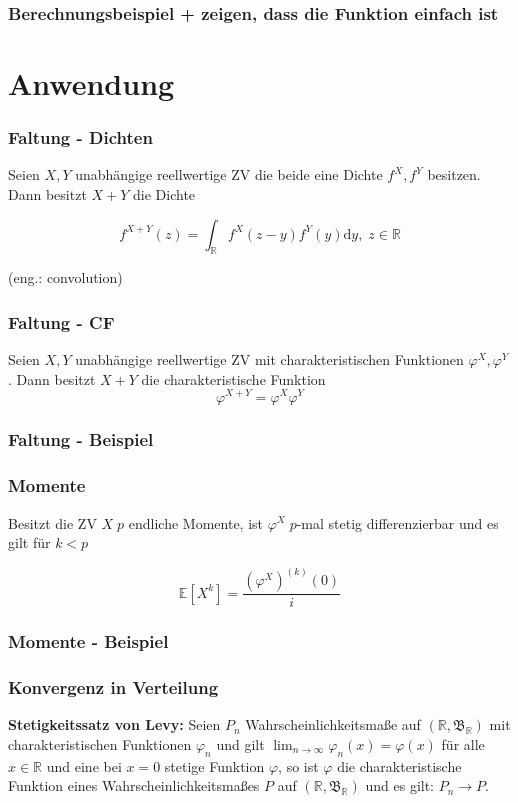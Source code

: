 \documentclass{beamer}
\newcommand{\R}{\mathbb{R}}
\newcommand{\E}{\mathbb{E}}
\newcommand\dint{\mathord{\mathrm{d}}}
\begin{document}
\begin{frame}
\frametitle{Berechnungsbeispiel + zeigen, dass die Funktion einfach ist}
\end{frame}

\section{Anwendung}

\begin{frame}
\frametitle{Faltung - Dichten}
  Seien $X, Y$ unabhängige reellwertige ZV die beide eine Dichte $f^X, f^Y$ besitzen. Dann besitzt $X+Y$ die Dichte

\begin{equation*}
  f^{X+Y}(z) = \int_{\R} f^X(z - y)f^Y(y) \dint y, \; z \in \R
\end{equation*}

(eng.: convolution)
\end{frame}

\begin{frame}
\frametitle{Faltung - CF}
  Seien $X, Y$ unabhängige reellwertige ZV mit charakteristischen Funktionen $\varphi^X, \varphi^Y$. Dann besitzt $X + Y$ die charakteristische Funktion
$$\varphi^{X+Y} = \varphi^X \varphi^Y$$
\end{frame}

\begin{frame}
\frametitle{Faltung - Beispiel}

\end{frame}

\begin{frame}
\frametitle{Momente}
Besitzt die ZV $X \; p$ endliche Momente, ist $\varphi^X \; p$-mal stetig differenzierbar und es gilt für $k < p$

\begin{equation*}
\E[X^k] = \frac{(\varphi^X)^{(k)}(0)}{i}
\end{equation*}
\end{frame}

\begin{frame}
\frametitle{Momente - Beispiel}
\end{frame}

\begin{frame}
\frametitle{Konvergenz in Verteilung}
\textbf{Stetigkeitssatz von Levy:} \hfill \newline
Seien $P_n$ Wahrscheinlichkeitsmaße auf $(\R, \mathfrak{B}_\R)$ mit charakteristischen Funktionen $\varphi_n$ und gilt $\lim_{n \to \infty} \varphi_n (x) = \varphi(x)$ für alle $x \in \R$ und eine bei $x = 0$ stetige Funktion $\varphi$, so ist $\varphi$ die charakteristische Funktion eines Wahrscheinlichkeitsmaßes $P$ auf $(\R, \mathfrak{B}_\R)$ und es gilt: $P_n \to P$.
\end{frame}
\end{document}
